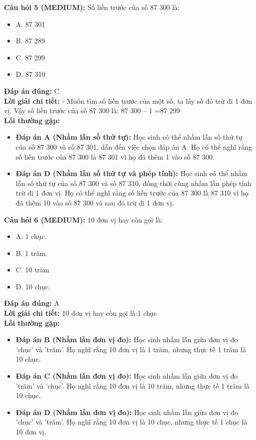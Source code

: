 \documentclass{article}
\begin{document}
\begin{minipage}{\textwidth}
\noindent\textbf{Câu hỏi 5 (MEDIUM):} Số liền trước của số 87 300 là: 
\begin{itemize}[label={}]
    \item A. 87 301
    \item B. 87 289
    \item C. 87 299
    \item D. 87 310
\end{itemize}
\textbf{Đáp án đúng:} C \\
\textbf{Lời giải chi tiết:} - Muốn tìm số liền trước của một số, ta lấy số đó trừ đi 1 đơn vị. Vậy số liền trước của số 87 300 là: 87 300 – 1 =87 299 \\
\textbf{Lỗi thường gặp:}
\begin{itemize}
  \item \textbf{Đáp án A (Nhầm lẫn số thứ tự):} Học sinh có thể nhầm lẫn số thứ tự của số 87 300 và số 87 301, dẫn đến việc chọn đáp án A. Họ có thể nghĩ rằng số liền trước của 87 300 là 87 301 vì họ đã thêm 1 vào số 87 300.
  \item \textbf{Đáp án D (Nhầm lẫn số thứ tự và phép tính):} Học sinh có thể nhầm lẫn số thứ tự của số 87 300 và số 87 310, đồng thời cũng nhầm lẫn phép tính trừ đi 1 đơn vị. Họ có thể nghĩ rằng số liền trước của 87 300 là 87 310 vì họ đã thêm 10 vào số 87 300 và sau đó trừ đi 1 đơn vị.
\end{itemize}
\end{minipage}
\vspace{1em}

\begin{minipage}{\textwidth}
\noindent\textbf{Câu hỏi 6 (MEDIUM):} 10 đơn vị hay còn gọi là: 
\begin{itemize}[label={}]
    \item A. 1 chục.
    \item B. 1 trăm.
    \item C. 10 trăm
    \item D. 10 chục.
\end{itemize}
\textbf{Đáp án đúng:} A \\
\textbf{Lời giải chi tiết:} 10 đơn vị hay còn gọi là:1 chục \\
\textbf{Lỗi thường gặp:}
\begin{itemize}
  \item \textbf{Đáp án B (Nhầm lẫn đơn vị đo):} Học sinh nhầm lẫn giữa đơn vị đo 'chục' và 'trăm'. Họ nghĩ rằng 10 đơn vị là 1 trăm, nhưng thực tế 1 trăm là 10 chục.
  \item \textbf{Đáp án C (Nhầm lẫn đơn vị đo):} Học sinh nhầm lẫn giữa đơn vị đo 'trăm' và 'chục'. Họ nghĩ rằng 10 đơn vị là 10 trăm, nhưng thực tế 1 trăm là 10 chục.
  \item \textbf{Đáp án D (Nhầm lẫn đơn vị đo):} Học sinh nhầm lẫn giữa đơn vị đo 'chục' và 'trăm'. Họ nghĩ rằng 10 đơn vị là 10 chục, nhưng thực tế 1 chục là 10 đơn vị.
\end{itemize}
\end{minipage}
\vspace{1em}
\end{document}
